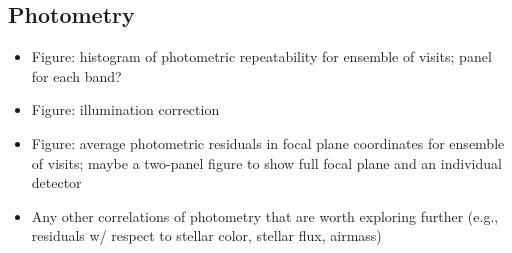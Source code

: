 \subsection{Photometry}
\label{sec:photometry}

\begin{itemize}
    \item Figure: histogram of photometric repeatability for ensemble of visits; panel for each band?
    \item Figure: illumination correction
    \item Figure: average photometric residuals in focal plane coordinates for ensemble of visits; maybe a two-panel figure to show full focal plane and an individual detector
    \item Any other correlations of photometry that are worth exploring further (e.g., residuals w/ respect to stellar color, stellar flux, airmass)
\end{itemize}